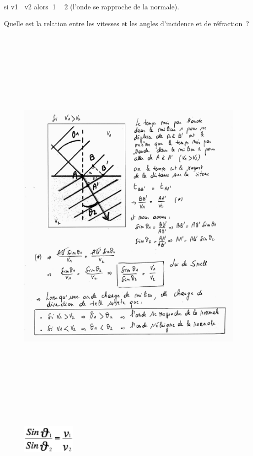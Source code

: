 si v1  v2 alors 1  2 (l'onde se rapproche de la normale).

Quelle est la relation entre les vitesses et les angles d'incidence et
de réfraction~?

\begin{figure}
\centering
\includegraphics[width=18.516cm,height=20.461cm]{Pictures/10000001000013080000150A74E0EE61F2B1EE2F.png}
\caption{}
\end{figure}

\begin{figure}
\centering
\includegraphics[width=2.634cm,height=1.412cm]{Pictures/1000000100000045000000258E7A9DA5E900B5EA.png}
\caption{}
\end{figure}


